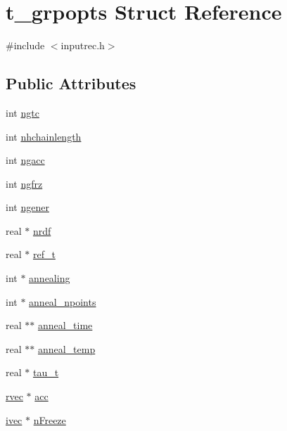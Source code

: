 \hypertarget{structt__grpopts}{\section{t\-\_\-grpopts \-Struct \-Reference}
\label{structt__grpopts}
}


{\ttfamily \#include $<$inputrec.\-h$>$}

\subsection*{\-Public \-Attributes}
\begin{DoxyCompactItemize}
\item 
int \hyperlink{structt__grpopts_a270ea0e2ac4251d31b6eee259bf55392}{ngtc}
\item 
int \hyperlink{structt__grpopts_a101e6b313c9ddc48986c5b6551a9ea54}{nhchainlength}
\item 
int \hyperlink{structt__grpopts_a1084231d94d78b425e66ec713ef88a5c}{ngacc}
\item 
int \hyperlink{structt__grpopts_abc194bb764d9f01138c13214b2c50825}{ngfrz}
\item 
int \hyperlink{structt__grpopts_a2a096f8ae6a0a5cc3c62a277fd021bfc}{ngener}
\item 
real $\ast$ \hyperlink{structt__grpopts_a0b0466980661963d6229bb8ddf794a27}{nrdf}
\item 
real $\ast$ \hyperlink{structt__grpopts_a6c8588da6e2f7042e3d0de987dd399ad}{ref\-\_\-t}
\item 
int $\ast$ \hyperlink{structt__grpopts_a6d22118a887b255f9a98986c683879d0}{annealing}
\item 
int $\ast$ \hyperlink{structt__grpopts_abbfd7bc3220c8d0c8fa7059c160d08e8}{anneal\-\_\-npoints}
\item 
real $\ast$$\ast$ \hyperlink{structt__grpopts_afca94e480d15c0ca4f70d809a44d7151}{anneal\-\_\-time}
\item 
real $\ast$$\ast$ \hyperlink{structt__grpopts_a462444c61b4e64c6cf95e7195f52cd19}{anneal\-\_\-temp}
\item 
real $\ast$ \hyperlink{structt__grpopts_afe9458443327430290b4b1f8e3d3f000}{tau\-\_\-t}
\item 
\hyperlink{share_2template_2gromacs_2types_2simple_8h_aa02a552a4abd2f180c282a083dc3a999}{rvec} $\ast$ \hyperlink{structt__grpopts_a559e4541ada72f0fa1eb6876a3078d6c}{acc}
\item 
\hyperlink{share_2template_2gromacs_2types_2simple_8h_a74f6ffdb4a9c1764f5293969d8c681b6}{ivec} $\ast$ \hyperlink{structt__grpopts_a4564ad9a3f20a0867f57478b7ddda6a7}{n\-Freeze}

\end{DoxyCompactItemize}
